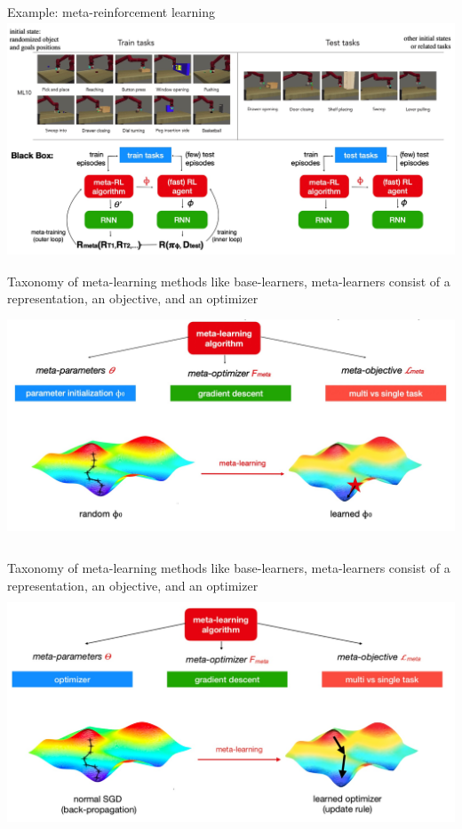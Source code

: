 \begin{frame}{Example: meta-reinforcement learning}
    \centering\includegraphics[height=7cm]{image/img004129.jpg}
\end{frame}

\begin{frame}{Taxonomy of meta-learning methods}
    \small like base-learners, meta-learners consist of a representation, an objective, and an optimizer
    \centering\includegraphics[height=7cm]{image/img004512.jpg}
\end{frame}


\begin{frame}{Taxonomy of meta-learning methods}
    \small like base-learners, meta-learners consist of a representation, an objective, and an optimizer
    \centering\includegraphics[height=7cm]{image/img004703.jpg}
\end{frame}


